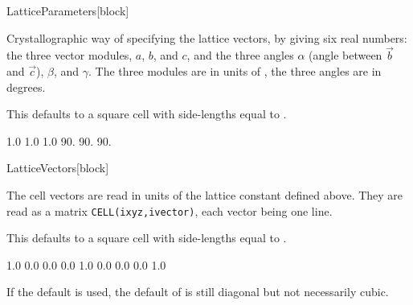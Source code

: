 \begin{fdfentry}{LatticeParameters}[block]

  Crystallographic way of specifying the lattice vectors, by giving
  six real numbers: the three vector modules, $a$, $b$, and $c$, and
  the three angles $\alpha$ (angle between $\vec b$ and $\vec c$),
  $\beta$, and $\gamma$. The three modules are in units of
  , the three angles are in degrees.

  This defaults to a square cell with side-lengths equal to .
  \begin{fdfexample}
    1.0  1.0  1.0   90.  90.  90.
  \end{fdfexample}
  
\end{fdfentry}

\begin{fdfentry}{LatticeVectors}[block]

  The cell vectors are read in units of the lattice constant defined
  above.  They are read as a matrix \texttt{CELL(ixyz,ivector)}, each
  vector being one line.

  This defaults to a square cell with side-lengths equal to .
  \begin{fdfexample}
    1.0  0.0  0.0
    0.0  1.0  0.0
    0.0  0.0  1.0
  \end{fdfexample}

  \noindent
  If the  default is used, the default of
   is still diagonal but not necessarily cubic.
  
\end{fdfentry}

